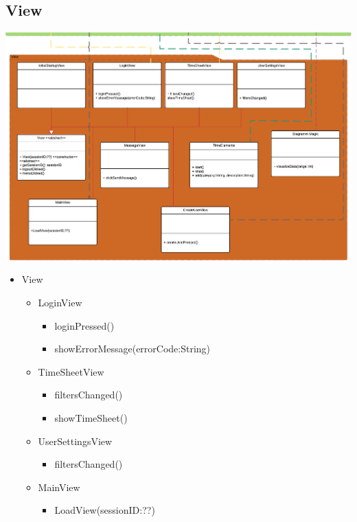 \begin{itemize}
    \subsection{View}
    \includegraphics[width=\linewidth]{Diagramms/class/view.pdf}\\
        \begin{itemize}
            \item{View}
                \begin{itemize}
                    \item{LoginView}
                    \begin{itemize}
                        \item{loginPressed()}
                        \item{showErrorMessage(errorCode:String)}
                    \end{itemize}

                    \item{TimeSheetView}
                    \begin{itemize}
                        \item{filtersChanged()}
                        \item{showTimeSheet()}
                    \end{itemize}

                    \item{UserSettingsView}
                    \begin{itemize}
                        \item{filtersChanged()}
                    \end{itemize}

                    \item{MainView}
                    \begin{itemize}
                        \item{LoadView(sessionID:??)}
                    \end{itemize}


\end{itemize}
\end{itemize}
\end{itemize}
